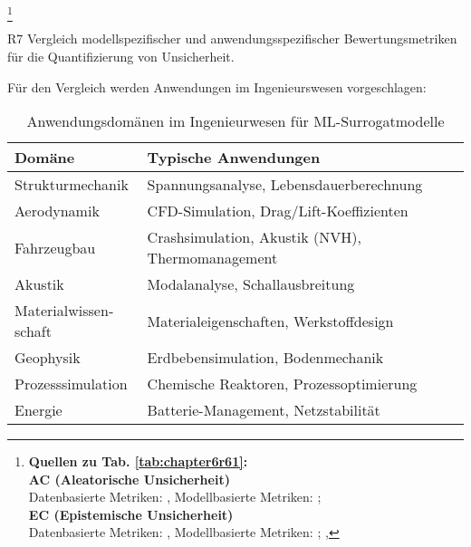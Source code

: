 \begin{otherlanguage}{ngerman}
\footnote{%
\begin{minipage}[t]{\textwidth}
\scriptsize
\textbf{Quellen zu Tab. \ref{tab:chapter6r61}:}\\[0.125em]
\textbf{AC (Aleatorische Unsicherheit)}\\
\quad Datenbasierte Metriken: \parencite[S.~28–30]{bishop2006pattern}, 
\quad Modellbasierte Metriken: \parencite[Kap.~2]{rasmussen2006gaussian}; \parencite{blundell2015weight}\\ [0.125em]

\textbf{EC (Epistemische Unsicherheit)}\\
\quad Datenbasierte Metriken: \parencite[S.~30–32]{bishop2006pattern}, 
\quad Modellbasierte Metriken: \parencite[S.~40–42]{gal2016uncertainty}; \parencite{sensoy2018evidential}, 
\end{minipage}%
}


\pagebreak


R7 Vergleich modellspezifischer und anwendungsspezifischer Bewertungsmetriken für die Quantifizierung von Unsicherheit.

Für den Vergleich werden Anwendungen im Ingenieurswesen vorgeschlagen: 

\begin{table}[!htbp]
\centering
\scriptsize
\begin{tabularx}{\textwidth}{|l|X|}
\hline
\textbf{Domäne} & \textbf{Typische Anwendungen} \\
\hline
Strukturmechanik & Spannungsanalyse, Lebensdauerberechnung \\
\hline
Aerodynamik & CFD-Simulation, Drag/Lift-Koeffizienten \\
\hline
Fahrzeugbau & Crashsimulation, Akustik (NVH), Thermomanagement \\
\hline
Akustik & Modalanalyse, Schallausbreitung \\
\hline
Materialwissenschaft & Materialeigenschaften, Werkstoffdesign \\
\hline
Geophysik & Erdbebensimulation, Bodenmechanik \\
\hline
Prozesssimulation & Chemische Reaktoren, Prozessoptimierung \\
\hline
Energie & Batterie-Management, Netzstabilität \\
\hline
\end{tabularx}
\caption{Anwendungsdomänen im Ingenieurwesen für ML-Surrogatmodelle}
\label{tab:ingenieurwesen-domains-small}
\end{table}


\end{otherlanguage}
